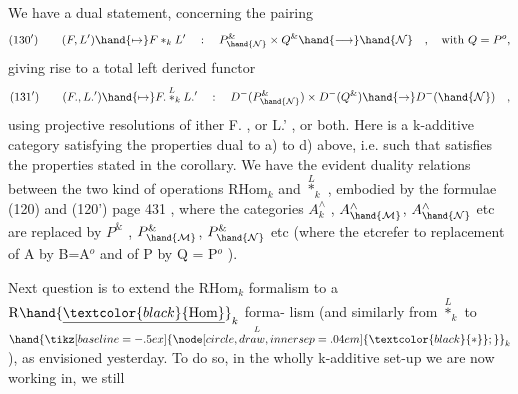 We have a dual statement, concerning the pairing
\[ (130') \qquad (F,L') \hand{\mapsto} F \ast_k L' \quad : \quad P^{\&}_{\hand{\mathcal{N}}} \times Q^{\&} \hand{\longrightarrow} \hand{\mathcal{N}} \quad , \quad \text{with } Q = P^{o} , \]
giving rise to a total left derived functor
\[ (131') \qquad (F.,L.') \hand{\mapsto} F. \overset{L}{\ast}_k L.' \quad : \quad D^{-}(P^{\&}_{\hand{\mathcal{N}}}) \times D^{-}(Q^{\&}) \hand{\rightarrow} D^{-}(\hand{\mathcal{N}}) \quad , \]
using  projective resolutions of ither F. , or L.' , or both.
Here  is a k-additive category satisfying the properties dual to
a) to d) above, i.e. such that  satisfies the properties stated
in the corollary. We have the evident duality relations between the
two kind of operations $\mathrm{RHom}_k$ and $\overset{L}{\ast}_k$ , embodied by the formulae
(120) and (120')  page 431 , where the categories $A^{\wedge}_k$ , $A^{\wedge}_{\hand{\mathcal{M}}}$, 
$A^{\wedge}_{\hand{\mathcal{N}}}$ etc are replaced by $P^{\&}$ , $P^{\&}_{\hand{\mathcal{M}}}$, $P^{\&}_{\hand{\mathcal{N}}}$ etc (where the etc\hand{/}refer to
replacement of A by B=A$^{o}$ and of P by Q = P$^{o}$ ).

Next question is to extend the $\mathrm{RHom}_k$ formalism to a $\mathrm{R}\hand{\underline{\textcolor{black}{\mathrm{Hom}}}}_k$ forma-%
lism (and similarly from $\overset{L}{\ast}_k$ to $\overset{L}{\hand{\mathbin{\tikz[baseline=-.5ex]{\node[circle,draw,inner sep=.04em] {\ensuremath{\textcolor{black}{*}}};}}}}_k$ ), as envisioned yesterday. To
do so, in the wholly k-additive set-up we are now working in, we still

